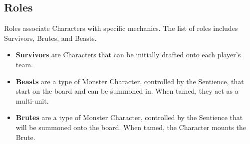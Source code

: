 \documentclass[../main.tex]{subfiles}
\begin{document}
\subsection{Roles}
Roles associate Characters with specific mechanics. The list of roles includes Survivors, Brutes, and Beasts. 

\begin{itemize}
    \item \textbf{Survivors} are Characters that can be initially drafted onto each player's team. 
    \item \textbf{Beasts} are a type of Monster Character, controlled by the Sentience, that start on the board and can be summoned in. When tamed, they act as a multi-unit.
    \item \textbf{Brutes} are a type of Monster Character, controlled by the Sentience that will be summoned onto the board. When tamed, the Character mounts the Brute. 
\end{itemize}

\clearpage
\end{document}
